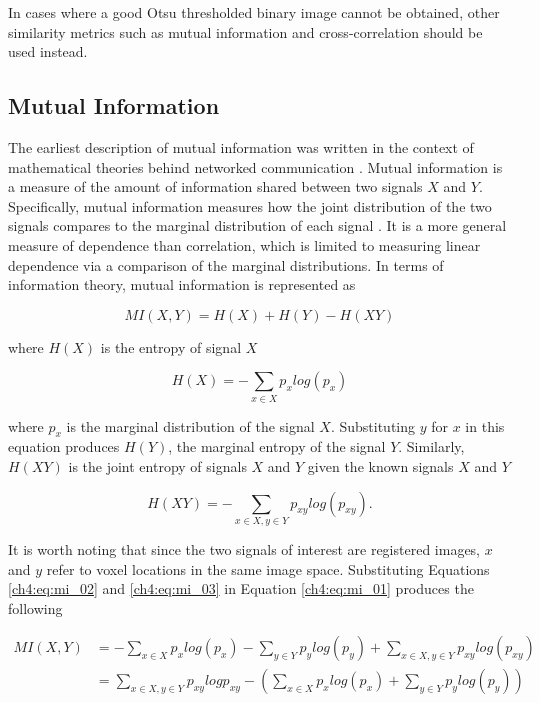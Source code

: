 In cases where a good Otsu thresholded binary image cannot be obtained, other similarity metrics such as mutual information and cross-correlation should be used instead.

\subsection{Mutual Information}

The earliest description of mutual information was written in the context of mathematical theories behind networked communication \cite{Shannon1948}. Mutual information is a measure of the amount of information shared between two signals $X$ and $Y$. Specifically, mutual information measures how the joint distribution of the two signals compares to the marginal distribution of each signal \cite{Li1990}. It is a more general measure of dependence than correlation, which is limited to measuring linear dependence via a comparison of the marginal distributions. In terms of information theory, mutual information is represented as

\begin{equation}
\label{ch4:eq:mi_01}
MI(X, Y) = H(X) + H(Y) - H(XY)
\end{equation}

\noindent where $H(X)$ is the entropy of signal $X$

\begin{equation}
\label{ch4:eq:mi_02}
H(X) = - \sum_{x \in X} p_x log(p_x) 
\end{equation}

\noindent where $p_x$ is the marginal distribution of the signal $X$. Substituting $y$ for $x$ in this equation produces $H(Y)$, the marginal entropy of the signal $Y$. Similarly, $H(XY)$ is the joint entropy of signals $X$ and $Y$ given the known signals $X$ and $Y$

\begin{equation}
\label{ch4:eq:mi_03}
H(XY) = - \sum_{x \in X, y \in Y} p_{xy} log (p_{xy}).
\end{equation}

It is worth noting that since the two signals of interest are registered images, $x$ and $y$ refer to voxel locations in the same image space. Substituting Equations \ref{ch4:eq:mi_02} and \ref{ch4:eq:mi_03} in Equation \ref{ch4:eq:mi_01} produces the following

\begin{equation}
\label{ch4:eq:mi_04}
\begin{split}
MI(X, Y) & = - \sum_{x \in X} p_x log(p_x) - \sum_{y \in Y} p_y log(p_y) + \sum_{x \in X, y \in Y} p_{xy} log (p_{xy}) \\
 & = \sum_{x \in X, y \in Y} p_{xy} log p_{xy} - \left( \sum_{x \in X} p_x log(p_x) + \sum_{y \in Y} p_y log(p_y) \right) \\
\end{split}
\end{equation}

